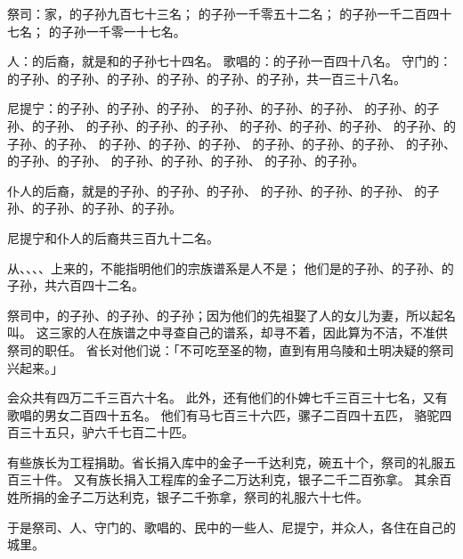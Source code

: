 {\par }{\PP {}祭司：{}家，{}的子孙九百七十三名；
的子孙一千零五十二名；
的子孙一千二百四十七名；
的子孙一千零一十七名。
\par }{\PP {}人：{}的后裔，就是{}和{}的子孙七十四名。
歌唱的：{}的子孙一百四十八名。
守门的：{}的子孙、{}的子孙、{}的子孙、{}的子孙、{}的子孙、{}的子孙，共一百三十八名。
\par }{\PP {}尼提宁：{}的子孙、{}的子孙、{}的子孙、
的子孙、{}的子孙、{}的子孙、
的子孙、{}的子孙、{}的子孙、
的子孙、{}的子孙、{}的子孙、
的子孙、{}的子孙、{}的子孙、
的子孙、{}的子孙、{}的子孙、
的子孙、{}的子孙、{}的子孙、
的子孙、{}的子孙、{}的子孙、
的子孙、{}的子孙、{}的子孙、
的子孙、{}的子孙、{}的子孙、
的子孙、{}的子孙。
\par }{\PP {}仆人的后裔，就是{}的子孙、{}的子孙、{}的子孙、
的子孙、{}的子孙、{}的子孙、
的子孙、{}的子孙、{}的子孙、{}的子孙。
\par }{\PP {}尼提宁和{}仆人的后裔共三百九十二名。
\par }{\PP {}从{}、{}、{}、{}、{}上来的，不能指明他们的宗族谱系是{}人不是；
他们是{}的子孙、{}的子孙、{}的子孙，共六百四十二名。
\par }{\PP {}祭司中，{}的子孙、{}的子孙、{}的子孙；因为他们的先祖娶了{}人{}的女儿为妻，所以起名叫{}。
这三家的人在族谱之中寻查自己的谱系，却寻不着，因此算为不洁，不准供祭司的职任。
省长对他们说：「不可吃至圣的物，直到有用乌陵和土明决疑的祭司兴起来。」
\par }{\PP {}会众共有四万二千三百六十名。
此外，还有他们的仆婢七千三百三十七名，又有歌唱的男女二百四十五名。
他们有马七百三十六匹，骡子二百四十五匹，
骆驼四百三十五只，驴六千七百二十匹。
\par }{\PP {}有些族长为工程捐助。省长捐入库中的金子一千达利克，碗五十个，祭司的礼服五百三十件。
又有族长捐入工程库的金子二万达利克，银子二千二百弥拿。
其余百姓所捐的金子二万达利克，银子二千弥拿，祭司的礼服六十七件。
\par }{\PP {}于是祭司、{}人、守门的、歌唱的、民中的一些人、尼提宁，并{}众人，各住在自己的城里。

}
